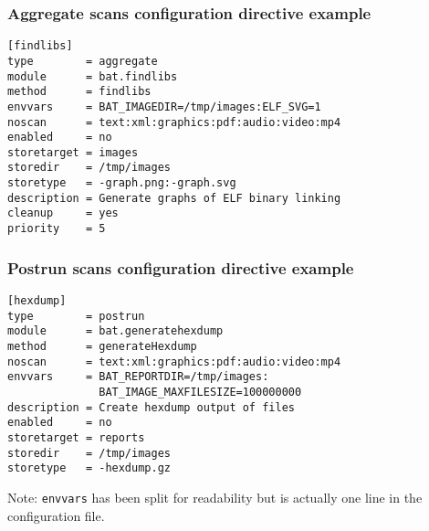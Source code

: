 \documentclass[11pt]{beamer}
\begin{document}
\begin{frame}[fragile]
\frametitle{Aggregate scans configuration directive example}
\begin{verbatim}
[findlibs]
type        = aggregate
module      = bat.findlibs
method      = findlibs
envvars     = BAT_IMAGEDIR=/tmp/images:ELF_SVG=1
noscan      = text:xml:graphics:pdf:audio:video:mp4
enabled     = no
storetarget = images
storedir    = /tmp/images
storetype   = -graph.png:-graph.svg
description = Generate graphs of ELF binary linking
cleanup     = yes
priority    = 5
\end{verbatim}
\end{frame}

\begin{frame}[fragile]
\frametitle{Postrun scans configuration directive example}
\begin{verbatim}
[hexdump]
type        = postrun
module      = bat.generatehexdump
method      = generateHexdump
noscan      = text:xml:graphics:pdf:audio:video:mp4
envvars     = BAT_REPORTDIR=/tmp/images:
              BAT_IMAGE_MAXFILESIZE=100000000
description = Create hexdump output of files
enabled     = no
storetarget = reports
storedir    = /tmp/images
storetype   = -hexdump.gz
\end{verbatim}

Note: \texttt{envvars} has been split for readability but is actually one line in the configuration file.
\end{frame}


\end{document}
